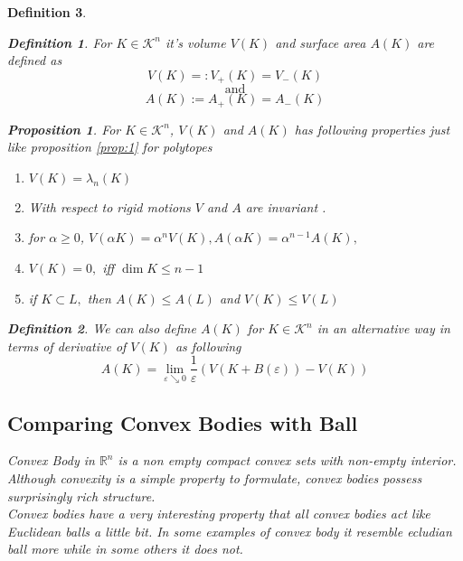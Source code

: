 \documentclass[oneside]{book}
\newtheorem{mydef}{Definition}
\newtheorem{prop}{Proposition}
\begin{document}
\begin{mydef}
 \begin{mydef} \label{d:16}
 For $K \in \mathcal{K}^n$ it's volume $V(K) $ and surface area $A(K)$ are defined as 
\[
  V(K) =: V_{+}(K)=V_{-}(K)
\]
$$\text{and} $$
\[
 A(K) :=  A_{+}(K) = A_{-}(K) 
\]
 
\end{mydef}
 \begin{prop}
 
For $ K \in \mathcal{K}^n $,  $V(K) $ and $A(K) $ has following properties just like proposition \ref{prop:1} for polytopes
\begin{enumerate}
    \item  $V(K)=\lambda_{n}(K)$
\item With respect to rigid motions $V$ and $A$ are invariant .
\item  for $\alpha \geq 0$, $V(\alpha K)=\alpha^{n} V(K), A(\alpha K)=\alpha^{n-1} A(K),$ 
\item $V(K)=0,$ iff $\operatorname{dim} K \leq n-1$
\item if $K \subset L,$ then  $A(K) \leq A(L)$ and $V(K) \leq V(L)$
\end{enumerate}
 \end{prop}
\begin{mydef} \label{d:17}
We can also define $A(K)$ for $K \in \mathcal{K}^n$ in an alternative way in terms of derivative of $V(K)$ as following \\
\begin{equation}
\label{eq48}
A(K)=\lim _{\varepsilon \searrow 0} \frac{1}{\varepsilon}(V(K+B(\varepsilon))-V(K))
\end{equation}
\end{mydef}
\newpage

\subsection{Comparing Convex Bodies with Ball}\label{ss:20}
Convex Body  in  $\mathbb{R}^n$  is a non empty compact convex sets with non-empty interior.\\
Although convexity is a simple property to formulate, convex bodies possess  surprisingly rich structure.\\
 Convex bodies have a very interesting property that all convex bodies act like Euclidean balls a little bit. In some examples of convex body it resemble ecludian ball more while in some others it does not.\\\\
 

\end{mydef}
\end{document}
